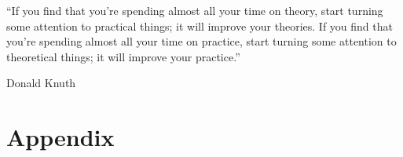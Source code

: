 \documentclass[a4paper,12pt]{memoir}
\begin{document}

\frontmatter

%


\cleardoublepage

\tableofcontents
\clearpage
\listoffigures
\clearpage
\listoftables

\cleardoublepage


\mainmatter

\thispagestyle{plain}
\epigraph{``If you find that you're spending almost all your time on theory, start turning some attention to practical things; it will improve your theories. If you find that you're spending almost all your time on practice, start turning some attention to theoretical things; it will improve your practice.''}{Donald Knuth}









\appendix

\part{Appendix}




\backmatter

\cleardoublepage


\end{document}
